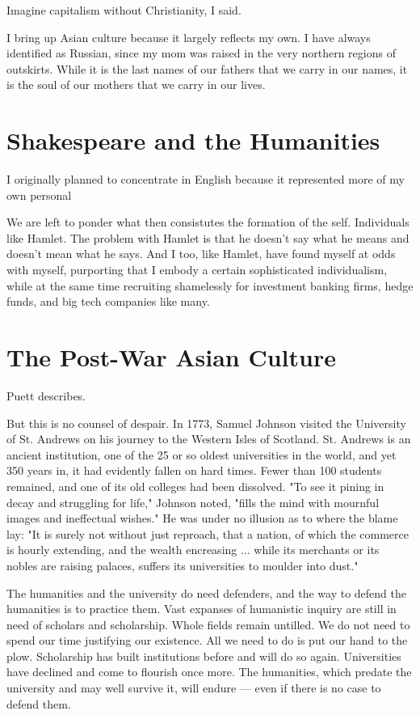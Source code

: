 \documentclass[12pt,letterpaper]{article}
\begin{document}
Imagine capitalism without Christianity, I said.

I bring up Asian culture because it largely reflects my own.  I have always identified as Russian, since my mom was raised in the very northern regions of outskirts.  While it is the last names of our fathers that we carry in our names, it is the soul of our mothers that we carry in our lives.


\section{Shakespeare and the Humanities}
I originally planned to concentrate in English because it represented more of my own personal 

We are left to ponder what then consistutes the formation of the self.  Individuals like Hamlet.  The problem with Hamlet is that he doesn't say what he means and doesn't mean what he says.  And I too, like Hamlet, have found myself at odds with myself, purporting that I embody a certain sophisticated individualism, while at the same time recruiting shamelessly for investment banking firms, hedge funds, and big tech companies like many.

\section{The Post-War Asian Culture}
Puett describes.  

But this is no counsel of despair. In 1773, Samuel Johnson visited the University of St. Andrews on his journey to the Western Isles of Scotland. St. Andrews is an ancient institution, one of the 25 or so oldest universities in the world, and yet 350 years in, it had evidently fallen on hard times. Fewer than 100 students remained, and one of its old colleges had been dissolved. "To see it pining in decay and struggling for life," Johnson noted, "fills the mind with mournful images and ineffectual wishes." He was under no illusion as to where the blame lay: "It is surely not without just reproach, that a nation, of which the commerce is hourly extending, and the wealth encreasing ... while its merchants or its nobles are raising palaces, suffers its universities to moulder into dust."

The humanities and the university do need defenders, and the way to defend the humanities is to practice them. Vast expanses of humanistic inquiry are still in need of scholars and scholarship. Whole fields remain untilled. We do not need to spend our time justifying our existence. All we need to do is put our hand to the plow. Scholarship has built institutions before and will do so again. Universities have declined and come to flourish once more. The humanities, which predate the university and may well survive it, will endure — even if there is no case to defend them.
\end{document}
